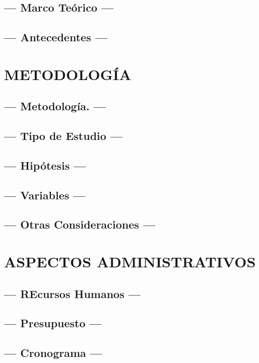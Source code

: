 \documentclass{amsart}
\begin{document}
\subsection{--- Marco Teórico ---} %
\label{sub:marco_teorico}

\subsection{--- Antecedentes ---} %
\label{sub:antecedentes}


\section{METODOLOGÍA} %
\label{sec:metodologia}

\subsection{--- Metodología. ---} %
\label{sub:metodologia}

\subsection{--- Tipo de Estudio ---} %
\label{sub:tipo_estudio}

\subsection{--- Hipótesis ---} %
\label{sub:hipotesis}

\subsection{--- Variables ---} %
\label{sub:variables}

\subsection{--- Otras Consideraciones ---} %
\label{sub:consideraciones}


\section{ASPECTOS ADMINISTRATIVOS} %
\label{sec:asp_administrativos}

\subsection{--- REcursos Humanos ---} %
\label{sub:recursos_humanos}

\subsection{--- Presupuesto ---} %
\label{sub:presupuesto}

\subsection{--- Cronograma ---} %
\label{sub:cronograma}


% 
% 
\end{document}
